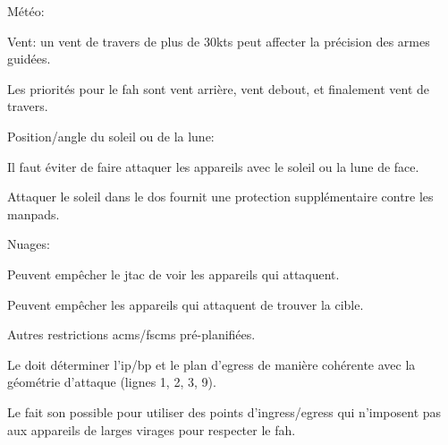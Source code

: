 \begin{e1}
\begin{e2}
\begin{e3}
		\end{e3}
		
		\item Météo:
		
		\begin{e3}
			
			\item Vent: un vent de travers de plus de 30kts peut affecter la précision des armes guidées.
			
			Les priorités pour le \gls{fah} sont vent arrière, vent debout, et finalement vent de travers.
			
			\item Position/angle du soleil ou de la lune:
			
			\begin{e4}
				
				\item Il faut éviter de faire attaquer les appareils avec le soleil ou la lune de face.
				
				\item Attaquer le soleil dans le dos fournit une protection supplémentaire contre les \glspl{manpad}.
				
			\end{e4}
			
			\item Nuages:
			
			\begin{e4}
				
				\item Peuvent empêcher le \gls{jtac} de voir les appareils qui attaquent.
				
				\item Peuvent empêcher les appareils qui attaquent de trouver la cible.
				
			\end{e4}
			
		\end{e3}
		
		\item Autres restrictions \glspl{acm}/\glspl{fscm} pré-planifiées.
		
		\item Le \ja{} doit déterminer l'\gls{ip}/\gls{bp} et le plan d'egress de manière cohérente avec la géométrie d'attaque (lignes 1, 2, 3, 9).
		
		Le \ja{} fait son possible pour utiliser des points d'ingress/egress qui n'imposent pas aux appareils de larges virages pour respecter le \gls{fah}.
		
	\end{e2}
	
\end{e1}

